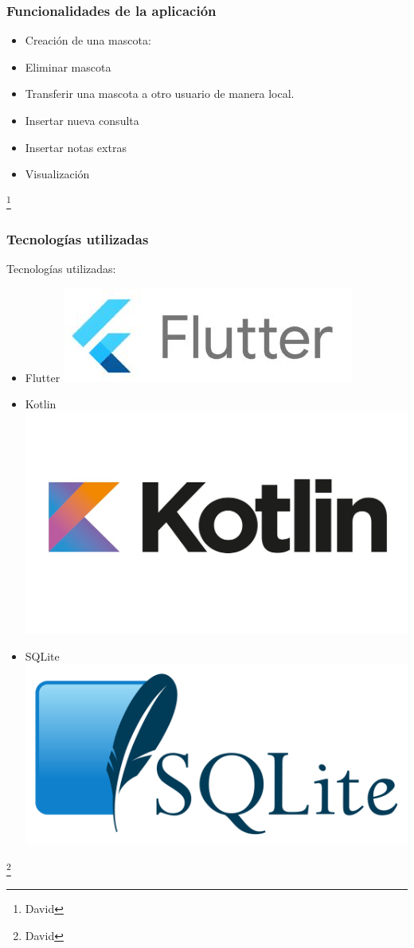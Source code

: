\documentclass[14pt]{beamer}
\begin{document}
\begin{frame}
\frametitle{Funcionalidades de la aplicación}
\begin{itemize}
\item Creación de una mascota:
\item Eliminar mascota
\item Transferir una mascota a otro usuario de manera local.
\item Insertar nueva consulta
\item Insertar notas extras
\item Visualización
\end{itemize}
\footnote{David}
\end{frame}


\begin{frame}
\frametitle{Tecnologías utilizadas}

Tecnologías utilizadas:
\begin{itemize}
\item Flutter
\includegraphics[scale =0.32]{Images/LogodeFlutter.jpg}
\item Kotlin
\includegraphics[scale =0.08]{Images/LogoKotlin.jpg}
\item SQLite
\includegraphics[scale =0.07]{Images/LogodeSQLite.png}
\end{itemize}
\footnote{David}
\end{frame}
\end{document}
